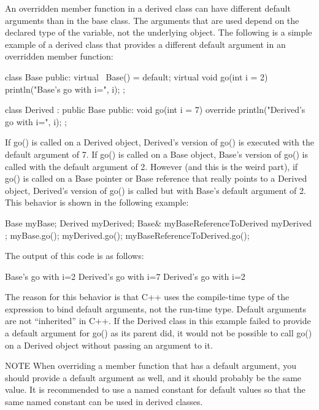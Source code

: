 
An overridden member function in a derived class can have different default arguments than in the base class. The arguments that are used depend on the declared type of the variable, not the underlying object. The following is a simple example of a derived class that provides a different default argument in an overridden member function:

\begin{cpp}
class Base
{
    public:
        virtual ~Base() = default;
        virtual void go(int i = 2) { println("Base's go with i={}", i); }
};

class Derived : public Base
{
    public:
        void go(int i = 7) override { println("Derived's go with i={}", i); }
};
\end{cpp}

If go() is called on a Derived object, Derived’s version of go() is executed with the default argument of 7. If go() is called on a Base object, Base’s version of go() is called with the default argument of 2. However (and this is the weird part), if go() is called on a Base pointer or Base reference that really points to a Derived object, Derived’s version of go() is called but with Base’s default argument of 2. This behavior is shown in the following example:

\begin{cpp}
Base myBase;
Derived myDerived;
Base& myBaseReferenceToDerived { myDerived };
myBase.go();
myDerived.go();
myBaseReferenceToDerived.go();
\end{cpp}

The output of this code is as follows:

\begin{shell}
Base's go with i=2
Derived's go with i=7
Derived's go with i=2
\end{shell}

The reason for this behavior is that C++ uses the compile-time type of the expression to bind default arguments, not the run-time type. Default arguments are not “inherited” in C++. If the Derived class in this example failed to provide a default argument for go() as its parent did, it would not be possible to call go() on a Derived object without passing an argument to it.

\begin{myNotic}{NOTE}
When overriding a member function that has a default argument, you should provide a default argument as well, and it should probably be the same value. It is recommended to use a named constant for default values so that the same named constant can be used in derived classes.
\end{myNotic}

